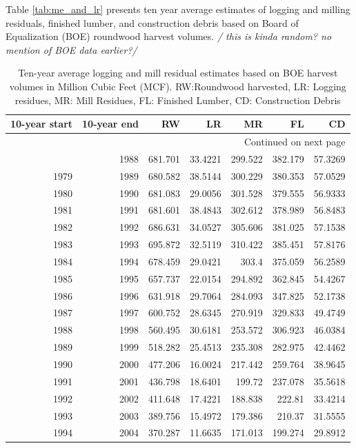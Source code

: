 \documentclass[a4paper]{article}
\begin{document}
Table \ref{tab:me_and_lr} presents ten year average estimates of logging and milling residuals, finished lumber, and construction debris based on Board of Equalization (BOE) roundwood harvest volumes. \emph{/ this is kinda random? no mention of BOE data earlier?/}

\begin{longtable}{rrrrrrr}
\caption{Ten-year average logging and mill residual estimates based on BOE harvest volumes in Million Cubic Feet (MCF). RW:Roundwood harvested, LR: Logging residues, MR: Mill Residues, FL: Finished Lumber, CD: Construction Debris}
\\
10-year start & 10-year end & RW & LR & MR & FL & CD\\
\hline
\endhead
\hline\multicolumn{7}{r}{Continued on next page} \\
\endfoot
\endlastfoot
1978 & 1988 & 681.701 & 33.4221 & 299.522 & 382.179 & 57.3269\\
1979 & 1989 & 680.582 & 38.5144 & 300.229 & 380.353 & 57.0529\\
1980 & 1990 & 681.083 & 29.0056 & 301.528 & 379.555 & 56.9333\\
1981 & 1991 & 681.601 & 38.4843 & 302.612 & 378.989 & 56.8483\\
1982 & 1992 & 686.631 & 34.0527 & 305.606 & 381.025 & 57.1538\\
1983 & 1993 & 695.872 & 32.5119 & 310.422 & 385.451 & 57.8176\\
1984 & 1994 & 678.459 & 29.0421 & 303.4 & 375.059 & 56.2589\\
1985 & 1995 & 657.737 & 22.0154 & 294.892 & 362.845 & 54.4267\\
1986 & 1996 & 631.918 & 29.7064 & 284.093 & 347.825 & 52.1738\\
1987 & 1997 & 600.752 & 28.6345 & 270.919 & 329.833 & 49.4749\\
1988 & 1998 & 560.495 & 30.6181 & 253.572 & 306.923 & 46.0384\\
1989 & 1999 & 518.282 & 25.4513 & 235.308 & 282.975 & 42.4462\\
1990 & 2000 & 477.206 & 16.0024 & 217.442 & 259.764 & 38.9645\\
1991 & 2001 & 436.798 & 18.6401 & 199.72 & 237.078 & 35.5618\\
1992 & 2002 & 411.648 & 17.4221 & 188.838 & 222.81 & 33.4214\\
1993 & 2003 & 389.756 & 15.4972 & 179.386 & 210.37 & 31.5555\\
1994 & 2004 & 370.287 & 11.6635 & 171.013 & 199.274 & 29.8912\\

\end{longtable}
\end{document}
